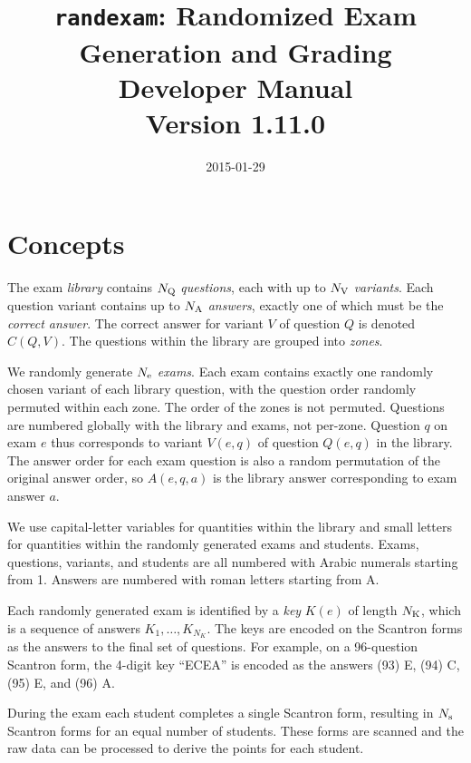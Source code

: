 \documentclass{article}
\begin{document}
\title{\texttt{randexam}: Randomized Exam Generation and Grading\\[1em] Developer Manual\\[1em] \Large Version 1.11.0}
\date{\vspace*{-2em}2015-01-29}
\maketitle

\section{Concepts}

The exam \emph{library} contains $N_{\rm Q}$ \emph{questions}, each
with up to $N_{\rm V}$ \emph{variants}. Each question variant contains
up to $N_{\rm A}$ \emph{answers}, exactly one of which must be the
\emph{correct answer}. The correct answer for variant $V$ of question
$Q$ is denoted $C(Q,V)$. The questions within the library are grouped
into \emph{zones}.

We randomly generate $N_{\rm e}$ \emph{exams}. Each exam contains
exactly one randomly chosen variant of each library question, with the
question order randomly permuted within each zone. The order of the
zones is not permuted. Questions are numbered globally with the
library and exams, not per-zone. Question $q$ on exam $e$ thus
corresponds to variant $V(e,q)$ of question $Q(e,q)$ in the
library. The answer order for each exam question is also a random
permutation of the original answer order, so $A(e,q,a)$ is the library
answer corresponding to exam answer $a$.

We use capital-letter variables for quantities within the library
and small letters for quantities within the randomly generated exams
and students. Exams, questions, variants, and students are all
numbered with Arabic numerals starting from 1. Answers are numbered
with roman letters starting from A.

Each randomly generated exam is identified by a \emph{key} $K(e)$ of
length $N_{\rm K}$, which is a sequence of answers
$K_1,\ldots,K_{N_K}$. The keys are encoded on the Scantron forms as
the answers to the final set of questions. For example, on a
96-question Scantron form, the 4-digit key ``ECEA'' is encoded as the
answers (93) E, (94) C, (95) E, and (96) A.

During the exam each student completes a single Scantron form,
resulting in $N_{\rm s}$ Scantron forms for an equal number of
students. These forms are scanned and the raw data can be processed to
derive the points for each student.
\end{document}
